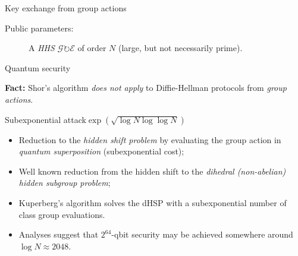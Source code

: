 \documentclass[aspectratio=169]{beamer}
\renewcommand{\a}{\mathfrak{a}}
\renewcommand{\b}{\mathfrak{b}}
\newcommand{\G}{\mathcal{G}}
\newcommand{\E}{\mathcal{E}}
\begin{document}
\begin{frame}{Key exchange from group actions}
  \begin{description}
  \item[Public parameters:] A \emph{HHS $\G\circlearrowright \E$} of
    order $N$ (large, but not necessarily prime).
  \end{description}

  \bigskip
  
  \begin{center}
  \end{center}
\end{frame}


\begin{frame}{Quantum security}

  \textbf{Fact:} Shor's algorithm \emph{does not apply} to Diffie-Hellman
  protocols from \emph{group actions}.

  \begin{block}{Subexponential attack\hfill\emph{$\exp(\sqrt{\log N\log\log N})$}}
    \begin{itemize}
    \item Reduction to the \emph{hidden shift problem} by evaluating
      the group action in \emph{quantum superposition} (subexponential
      cost);
    \item Well known reduction from the hidden shift to the
      \emph{dihedral (non-abelian) hidden subgroup problem};
    \item Kuperberg's algorithm solves the dHSP with a subexponential
      number of class group evaluations.
    \item Analyses suggest that $2^{64}$-qbit security may be achieved
      somewhere around $\log N \approx 2048$.
    \end{itemize}
  \end{block}
\end{frame}
\end{document}
